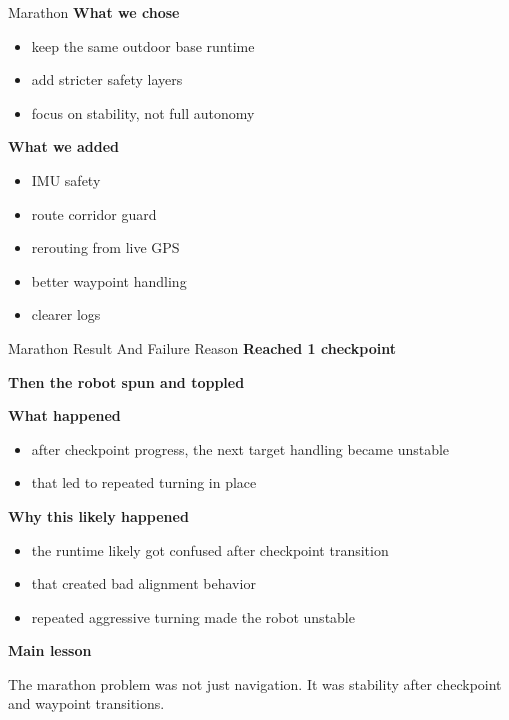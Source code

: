 \documentclass[aspectratio=169]{beamer}
\begin{document}
\begin{frame}{Marathon}
\textbf{What we chose}
\begin{itemize}
  \item keep the same outdoor base runtime
  \item add stricter safety layers
  \item focus on stability, not full autonomy
\end{itemize}

\vspace{0.5em}
\textbf{What we added}
\begin{itemize}
  \item IMU safety
  \item route corridor guard
  \item rerouting from live GPS
  \item better waypoint handling
  \item clearer logs
\end{itemize}
\end{frame}

\begin{frame}{Marathon Result And Failure Reason}
\Large
\centering
\textbf{Reached 1 checkpoint}

\vspace{0.8em}
\textbf{Then the robot spun and toppled}

\normalsize
\vspace{1.0em}
\textbf{What happened}
\begin{itemize}
  \item after checkpoint progress, the next target handling became unstable
  \item that led to repeated turning in place
\end{itemize}

\vspace{0.5em}
\textbf{Why this likely happened}
\begin{itemize}
  \item the runtime likely got confused after checkpoint transition
  \item that created bad alignment behavior
  \item repeated aggressive turning made the robot unstable
\end{itemize}

\vspace{0.5em}
\textbf{Main lesson}

The marathon problem was not just navigation. It was stability after checkpoint and waypoint transitions.
\end{frame}
\end{document}
